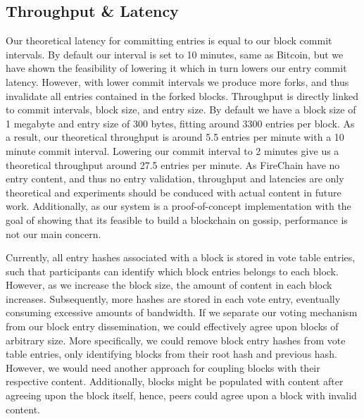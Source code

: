\documentclass[USenglish]{uit-thesis}
\begin{document}
\subsection{Throughput \& Latency}
Our theoretical latency for committing entries is equal to our block commit intervals.
By default our interval is set to 10 minutes, same as Bitcoin, but we have shown the feasibility of lowering it which in turn lowers our entry commit latency.
However, with lower commit intervals we produce more forks, and thus invalidate all entries contained in the forked blocks.
Throughput is directly linked to commit intervals, block size, and entry size.
By default we have a block size of 1 megabyte and entry size of 300 bytes, fitting around 3300 entries per block.
As a result, our theoretical throughput is around 5.5 entries per minute with a 10 minute commit interval.
Lowering our commit interval to 2 minutes give us a theoretical throughput around 27.5 entries per minute.
As FireChain have no entry content, and thus no entry validation, throughput and latencies are only theoretical and experiments should be conduced with actual content in future work.
Additionally, as our system is a proof-of-concept implementation with the goal of showing that its feasible to build a blockchain on gossip, performance is not our main concern. 



   
    
 


Currently, all entry hashes associated with a block is stored in vote table entries, such that participants can identify which block entries belongs to each block.
However, as we increase the block size, the amount of content in each block increases.
Subsequently, more hashes are stored in each vote entry, eventually consuming excessive amounts of bandwidth.
If we separate our voting mechanism from our block entry dissemination, we could effectively agree upon blocks of arbitrary size.
More specifically, we could remove block entry hashes from vote table entries, only identifying blocks from their root hash and previous hash.
However, we would need another approach for coupling blocks with their respective content.
Additionally, blocks might be populated with content after agreeing upon the block itself, hence, peers could agree upon a block with invalid content.
 
\end{document}
